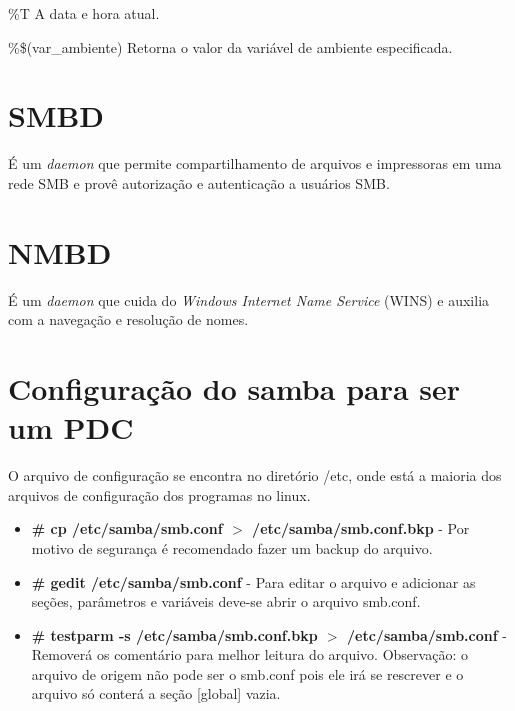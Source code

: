\%T
A data e hora atual.

\%\$(var\_ambiente)
Retorna o valor da variável de ambiente especificada.

\section{SMBD}

É um \textit{daemon} que permite compartilhamento de arquivos e impressoras em uma rede SMB e provê autorização e autenticação a usuários SMB. \cite{SAMBA}

\section{NMBD}

É um \textit{daemon} que cuida do \textit{Windows Internet Name Service} (WINS) e auxilia com a navegação e resolução de nomes.
\cite{SAMBA}

\section{Configuração do samba para ser um PDC}

O arquivo de configuração se encontra no diretório /etc, onde está a maioria dos arquivos de configuração dos programas no linux.

\begin{itemize}
	\item \textbf{\# cp /etc/samba/smb.conf $>$ /etc/samba/smb.conf.bkp} - Por motivo de segurança é recomendado fazer um backup do arquivo.
	\item \textbf{\# gedit /etc/samba/smb.conf} - Para editar o arquivo e adicionar as seções, parâmetros e variáveis deve-se abrir o arquivo smb.conf.
	\item \textbf{\# testparm -s /etc/samba/smb.conf.bkp $>$ /etc/samba/smb.conf} - Removerá os comentário para melhor leitura do arquivo. Observação: o arquivo de origem não pode ser o smb.conf pois ele irá se rescrever e o arquivo só conterá a seção [global] vazia.  
\end{itemize}

